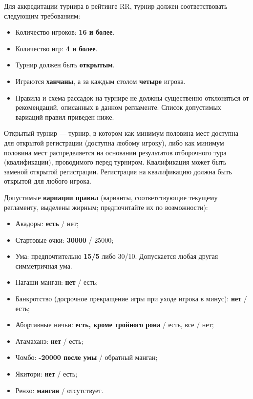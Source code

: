 Для аккредитации турнира в рейтинге RR, турнир должен соответствовать следующим требованиям:

\begin{itemize}
	\item Количество игроков: \textbf{16 и более}.
	\item Количество игр: \textbf{4 и более}.
	\item Турнир должен быть \textbf{открытым}.
	\item Играются \textbf{ханчаны}, а за каждым столом \textbf{четыре} игрока.
	\item Правила и схема рассадок на турнире не должны существенно отклоняться от рекомендаций, описанных в данном регламенте. Список допустимых вариаций правил приведен ниже.
\end{itemize}

Открытый турнир --- турнир, в котором как минимум половина мест доступна для открытой регистрации (доступна любому игроку), либо как минимум половина мест распределяется на основании результатов отборочного тура (квалификации), проводимого перед турниром. Квалификация может быть заменой открытой регистрации. Регистрация на квалификацию должна быть открытой для любого игрока.

Допустимые \textbf{вариации правил} (варианты, соответствующие текущему регламенту, выделены жирным; предпочитайте их по возможности):
\begin{itemize}
	\item Акадоры: \textbf{есть} / нет;
	\item Стартовые очки: \textbf{30000} / 25000;
	\item Ума: предпочтительно \textbf{15/5} либо 30/10. Допускается любая другая симметричная ума.
	\item Нагаши манган: \textbf{нет} / есть;
	\item Банкротство (досрочное прекращение игры при уходе игрока в минус): \textbf{нет} / есть;
	\item Абортивные ничьи: \textbf{есть, кроме тройного рона} / есть, все / нет;
	\item Атамаханэ: \textbf{нет} / есть;
	\item Чомбо: \textbf{-20000 после умы} / обратный манган;
	\item Якитори: \textbf{нет} / есть;
	\item Ренхо: \textbf{манган} / отсутствует.
\end{itemize}

